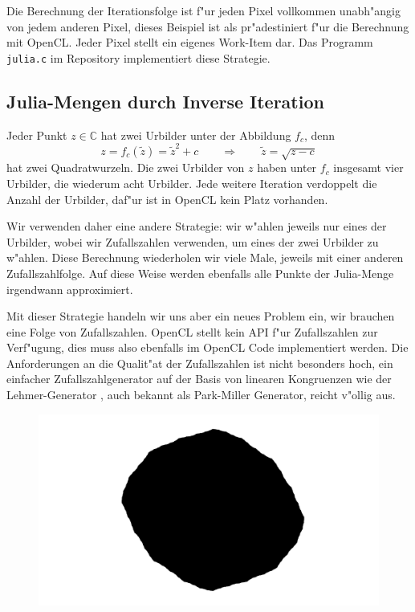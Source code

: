 \begin{refsection}
Die Berechnung der Iterationsfolge ist f"ur jeden Pixel vollkommen
unabh"angig von jedem anderen Pixel, dieses Beispiel ist als pr"adestiniert
f"ur die Berechnung mit OpenCL.
Jeder Pixel stellt ein eigenes Work-Item dar.
Das Programm {\tt julia.c} im Repository implementiert diese Strategie.


\subsection{Julia-Mengen durch Inverse Iteration}
Jeder Punkt $z\in\mathbb C$ hat zwei Urbilder unter der Abbildung $f_c$,
denn
\[
z=f_c(\tilde z)=\tilde z^2+c
\qquad\Rightarrow\qquad
\tilde z=\sqrt{z-c}
\]
hat zwei Quadratwurzeln. 
Die zwei Urbilder von $z$ haben unter $f_c$ insgesamt vier Urbilder, 
die wiederum acht Urbilder.
Jede weitere Iteration verdoppelt die Anzahl der Urbilder, daf"ur ist
in OpenCL kein Platz vorhanden.

Wir verwenden daher eine andere Strategie: wir w"ahlen jeweils nur eines
der Urbilder, wobei wir Zufallszahlen verwenden, um eines der zwei
Urbilder zu w"ahlen.
Diese Berechnung wiederholen wir viele Male, jeweils mit einer anderen
Zufallszahlfolge.
Auf diese Weise werden ebenfalls alle Punkte der Julia-Menge irgendwann
approximiert.

Mit dieser Strategie handeln wir uns aber ein neues Problem ein, wir brauchen
eine Folge von Zufallszahlen.
OpenCL stellt kein API f"ur Zufallszahlen zur Verf"ugung, dies muss also
ebenfalls im OpenCL Code implementiert werden.
Die Anforderungen an die Qualit"at der Zufallszahlen ist nicht besonders
hoch, ein einfacher Zufallszahlgenerator auf der Basis von linearen
Kongruenzen wie der Lehmer-Generator \cite{julia:lehmer},
auch bekannt als Park-Miller Generator, reicht v"ollig aus.

\begin{figure}
\begin{center}
\includegraphics[width=\hsize]{julia/a.png}


\end{center}
\end{figure}
\end{refsection}
